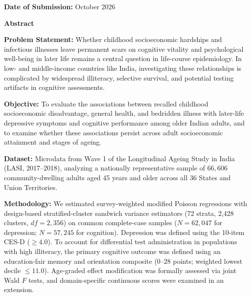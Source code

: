 \begin{titlepage}
    \vfill
    
    {\large \textbf{Date of Submission:} October 2026\par}
    \vspace*{0.5cm}
\end{titlepage}

\newpage
{}
\setcounter{page}{2}

\begin{center}
    {\Large \bfseries \color{navyblue} Abstract}
\end{center}

\vspace{0.5cm}

\noindent \textbf{Problem Statement:} 
Whether childhood socioeconomic hardships and infectious illnesses leave permanent scars on cognitive vitality and psychological well-being in later life remains a central question in life-course epidemiology. In low- and middle-income countries like India, investigating these relationships is complicated by widespread illiteracy, selective survival, and potential testing artifacts in cognitive assessments.

\vspace{0.3cm}
\noindent \textbf{Objective:} 
To evaluate the associations between recalled childhood socioeconomic disadvantage, general health, and bedridden illness with later-life depressive symptoms and cognitive performance among older Indian adults, and to examine whether these associations persist across adult socioeconomic attainment and stages of ageing.

\vspace{0.3cm}
\noindent \textbf{Dataset:} 
Microdata from Wave 1 of the Longitudinal Ageing Study in India (LASI, 2017--2018), analyzing a nationally representative sample of $66,606$ community-dwelling adults aged 45 years and older across all 36 States and Union Territories.

\vspace{0.3cm}
\noindent \textbf{Methodology:} 
We estimated survey-weighted modified Poisson regressions with design-based stratified-cluster sandwich variance estimators (72 strata, 2,428 clusters, $df=2,356$) on common complete-case samples ($N=62,047$ for depression; $N=57,245$ for cognition). Depression was defined using the 10-item CES-D ($\ge 4.0$). To account for differential test administration in populations with high illiteracy, the primary cognitive outcome was defined using an education-fair memory and orientation composite (0--28 points; weighted lowest decile $\le 11.0$). Age-graded effect modification was formally assessed via joint Wald $F$ tests, and domain-specific continuous scores were examined in an extension.

